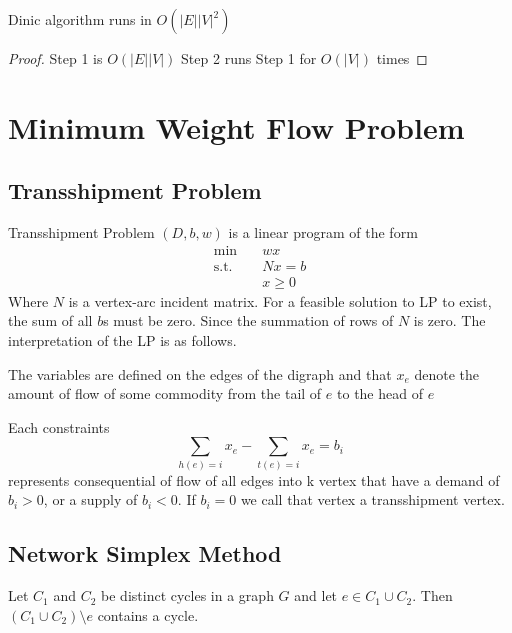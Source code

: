 			\begin{theorem}
				Dinic algorithm runs in $O(|E||V|^2)$
			\end{theorem}

			\begin{proof}
				Step 1 is $O(|E||V|)$
				Step 2 runs Step 1 for $O(|V|)$ times
			\end{proof}

	\chapter{Minimum Weight Flow Problem}
		\section{Transshipment Problem}
			Transshipment Problem $(D, b, w)$ is a linear program of the form
			\begin{align}
				\min \quad & wx\\
				\text{s.t.} \quad & Nx = b\\
								  & x \ge 0
			\end{align}
			Where $N$ is a vertex-arc incident matrix. For a feasible solution to LP to exist, the sum of all $b$s must be zero. Since the summation of rows of $N$ is zero. The interpretation of the LP is as follows.

			The variables are defined on the edges of the digraph and that $x_e$ denote the amount of flow of some commodity from the tail of $e$ to the head of $e$

			Each constraints
			\begin{equation}
				\sum_{h(e) = i} x_e - \sum_{t(e) = i}x_e = b_i
			\end{equation}
			represents consequential of flow of all edges into k vertex that have a demand of $b_i > 0$, or a supply of $b_i < 0$. If $b_i = 0$ we call that vertex a transshipment vertex.

		\section{Network Simplex Method}

			\begin{lemma}
				Let $C_1$ and $C_2$ be distinct cycles in a graph $G$ and let $e\in C_1 \cup C_2$. Then $(C_1 \cup C_2) \setminus e$ contains a cycle.
			\end{lemma}

